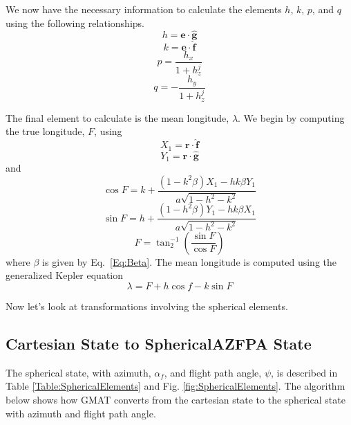 We now have the necessary information to calculate the elements
$h$, $k$, $p$, and $q$ using the following relationships.
%
\begin{equation}
    h = \mathbf{e} \cdot \hat{\mathbf{g}}
\end{equation}
%
\begin{equation}
    k = \mathbf{e} \cdot \hat{\mathbf{f}}
\end{equation}
%
\begin{equation}
    p = \frac{h_x}{1+h_z^j}
\end{equation}
%
\begin{equation}
    q = - \frac{h_y}{1+h_z^j}
\end{equation}
%

The final element to calculate is the mean longitude, $\lambda$.
We begin by computing the true longitude, $F$,  using
%
\begin{equation}
    X_1 = \mathbf{r} \cdot \hat{\mathbf{f}}
\end{equation}
%
\begin{equation}
    Y_1 = \mathbf{r} \cdot \hat{\mathbf{g}}
\end{equation}
%
and
%
\begin{equation}
     \cos{F} = k + \frac{ \left( 1 - k^2 \beta \right) X_1 - h k \beta Y_1}{a\sqrt{1 - h^2 - k^2}}
\end{equation}
%
\begin{equation}
     \sin{F} = h + \frac{ \left( 1 - h^2 \beta \right) Y_1 - h k \beta X_1}{a\sqrt{1 - h^2 - k^2}}
\end{equation}
%
\begin{equation}
     F = \tan^{-1}_2\left( \frac{\sin{F}}{\cos{F}}\right)
\end{equation}
%
where $\beta$ is given by Eq.~\ref{Eq:Beta}.  The mean longitude
is computed using the generalized Kepler equation
%
\begin{equation}
    \lambda = F + h \cos{f} - k \sin{F}
\end{equation}

Now let's look at transformations involving the spherical
elements.

\subsection{Cartesian State to SphericalAZFPA State}
\label{Sec:CarttoSphericalAZFPA}  

The spherical state, with azimuth, $\alpha_f$, and flight path
angle, $\psi$, is described in Table \ref{Table:SphericalElements}
and Fig. \ref{fig:SphericalElements}.  The algorithm below shows
how GMAT converts from the cartesian state to the spherical state
with azimuth and flight path angle.

